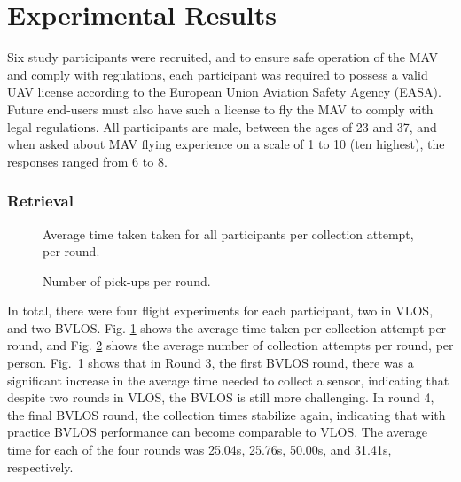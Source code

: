 


\section{Experimental Results}


Six study participants were recruited, and to ensure safe operation of the \ac{MAV} and comply with regulations, each participant was required to possess a valid UAV license according to the European Union Aviation Safety Agency (EASA). Future end-users must also have such a license to fly the \ac{MAV} to comply with legal regulations. All participants are male, between the ages of 23 and 37, and when asked about \ac{MAV} flying experience on a scale of 1 to 10 (ten highest), the responses ranged from 6 to 8. 

\subsubsection{Retrieval}

\begin{figure}[!t]
\centering

\vspace{-0.6em}
\caption{Average time taken taken for all participants per collection attempt, per round.}
\label{fig:fig4-retrieval-time-boxplot}
\end{figure}

\begin{figure}[!t]
\centering

\vspace{-0.6em}
\caption{Number of pick-ups per round.}
\label{fig:fig4-retrieval-number-boxplot}
\end{figure}


In total, there were four flight experiments for each participant, two in \ac{VLOS}, and two \ac{BVLOS}. Fig. \ref{fig:fig4-retrieval-time-boxplot} shows the average time taken per collection attempt per round, and Fig. \ref{fig:fig4-retrieval-number-boxplot} shows the average number of  collection attempts per round, per person. Fig.~\ref{fig:fig4-retrieval-time-boxplot} shows that in Round 3, the first \ac{BVLOS} round, there was a significant increase in the average time needed to collect a sensor, indicating that despite two rounds in \ac{VLOS}, the \ac{BVLOS} is still more challenging. In round 4, the final \ac{BVLOS} round, the collection times stabilize again, indicating that with practice \ac{BVLOS} performance can become comparable to \ac{VLOS}.
The average time for each of the four rounds was 25.04s, 25.76s, 50.00s, and 31.41s, respectively. 


